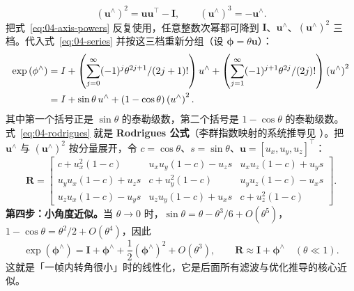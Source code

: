 \begin{equation}
  \left(\bm{u}^{\wedge}\right)^{2} = \bm{u}\bm{u}^{\top} - \bm{I},
  \qquad
  \left(\bm{u}^{\wedge}\right)^{3} = -\bm{u}^{\wedge}.
  \label{eq:04-axis-powers}
\end{equation}
把式~\eqref{eq:04-axis-powers} 反复使用，任意整数次幂都可降到 $\bm{I}$、$\bm{u}^{\wedge}$、$(\bm{u}^{\wedge})^{2}$ 三档。代入式~\eqref{eq:04-series} 并按这三档重新分组（设 $\bm{\phi}=\theta\bm{u}$）：
\begin{align}
  \exp\left(\phi^{\wedge}\right)
  &= I
   + \left(\sum_{j=0}^{\infty}(-1)^{j}\theta^{2j+1}/(2j+1)!\right)u^{\wedge}
   + \left(\sum_{j=1}^{\infty}(-1)^{j+1}\theta^{2j}/(2j)!\right)\left(u^{\wedge}\right)^{2} \notag\\
  &= I + \sin\theta\,u^{\wedge}
   + \left(1-\cos\theta\right)\left(u^{\wedge}\right)^{2}.
  \label{eq:04-rodrigues}
\end{align}
其中第一个括号正是 $\sin\theta$ 的泰勒级数，第二个括号是 $1-\cos\theta$ 的泰勒级数。式~\eqref{eq:04-rodrigues} 就是 \textbf{Rodrigues 公式}（李群指数映射的系统推导见 \cite{barfoot2017state,sola2017eskf}）。把 $\bm{u}^{\wedge}$ 与 $(\bm{u}^{\wedge})^{2}$ 按分量展开，令 $c=\cos\theta$、$s=\sin\theta$、$\bm{u}=[u_x,u_y,u_z]^{\top}$：
\begin{equation}
  \bm{R} = \begin{bmatrix}
    c+u_x^{2}(1-c) & u_xu_y(1-c)-u_zs & u_xu_z(1-c)+u_ys\\
    u_yu_x(1-c)+u_zs & c+u_y^{2}(1-c) & u_yu_z(1-c)-u_xs\\
    u_zu_x(1-c)-u_ys & u_zu_y(1-c)+u_xs & c+u_z^{2}(1-c)
  \end{bmatrix}.
  \label{eq:04-rotmat}
\end{equation}
\textbf{第四步：小角度近似。}当 $\theta\to0$ 时，$\sin\theta=\theta-\theta^{3}/6+O(\theta^{5})$，$1-\cos\theta=\theta^{2}/2+O(\theta^{4})$，因此
\begin{equation}
  \exp\left(\bm{\phi}^{\wedge}\right)
  = \bm{I} + \bm{\phi}^{\wedge} + \frac{1}{2}\left(\bm{\phi}^{\wedge}\right)^{2} + O(\theta^{3}),
  \qquad
  \bm{R}\approx\bm{I}+\bm{\phi}^{\wedge}\quad(\theta\ll1).
  \label{eq:04-rot-approx}
\end{equation}
这就是「一帧内转角很小」时的线性化，它是后面所有滤波与优化推导的核心近似。


